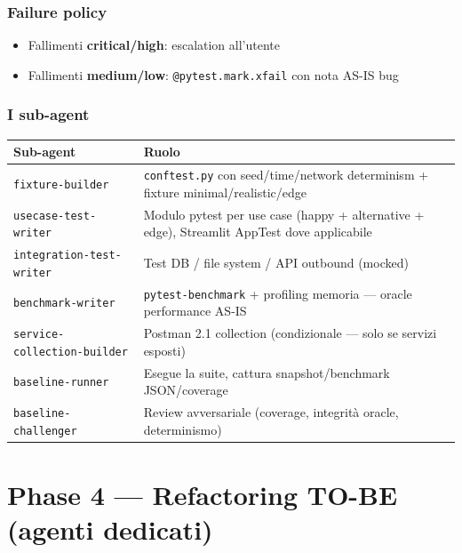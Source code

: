 \documentclass[12pt,a4paper,twoside]{book}
\begin{document}
\subsection{Failure policy}

\begin{itemize}
  \item Fallimenti \textbf{critical/high}: escalation all'utente
  \item Fallimenti \textbf{medium/low}: \texttt{@pytest.mark.xfail} con nota AS-IS bug
\end{itemize}

\subsection{I sub-agent}

\begin{center}
\begin{longtable}{lp{9cm}}
\toprule
\textbf{Sub-agent} & \textbf{Ruolo} \\
\midrule
\endhead
\texttt{fixture-builder} & \texttt{conftest.py} con seed/time/network determinism + fixture minimal/realistic/edge \\
\texttt{usecase-test-writer} & Modulo pytest per use case (happy + alternative + edge), Streamlit AppTest dove applicabile \\
\texttt{integration-test-writer} & Test DB / file system / API outbound (mocked) \\
\texttt{benchmark-writer} & \texttt{pytest-benchmark} + profiling memoria — oracle performance AS-IS \\
\texttt{service-collection-builder} & Postman 2.1 collection (condizionale — solo se servizi esposti) \\
\texttt{baseline-runner} & Esegue la suite, cattura snapshot/benchmark JSON/coverage \\
\texttt{baseline-challenger} & Review avversariale (coverage, integrità oracle, determinismo) \\
\bottomrule
\end{longtable}
\end{center}

\chapter{Phase 4 — Refactoring TO-BE (agenti dedicati)}
\end{document}
